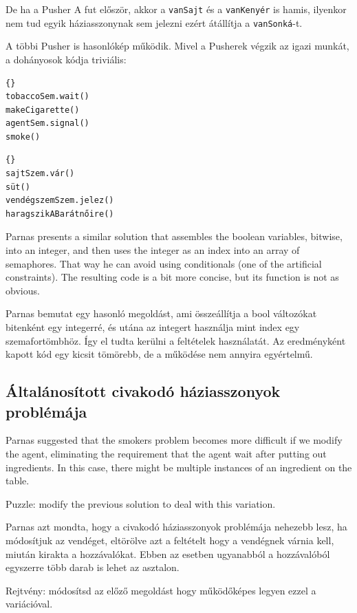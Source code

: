 \documentclass{book}
\begin{document}
De ha a Pusher A fut először, akkor a {\tt vanSajt} és a {\tt vanKenyér}
is hamis, ilyenkor nem tud egyik háziasszonynak sem jelezni ezért
átállítja a {\tt vanSonká}-t.

A többi Pusher is hasonlókép működik. Mivel a Pusherek végzik
az igazi munkát, a dohányosok kódja triviális:

\begin{lstlisting}[title={Smoker with tobacco}]{}
tobaccoSem.wait()
makeCigarette()
agentSem.signal()
smoke()
\end{lstlisting}

\begin{lstlisting}[title={Sajtos háziasszony}]{}
sajtSzem.vár()
süt()
vendégszemSzem.jelez()
haragszikABarátnőire()
\end{lstlisting}

Parnas presents a similar solution that assembles the
boolean variables, bitwise, into an integer, and then
uses the integer as an index into an array of semaphores.
That way he can avoid using conditionals (one of the
artificial constraints).  The resulting code is a bit
more concise, but its function is not as obvious.

Parnas bemutat egy hasonló megoldást, ami összeállítja a
bool változókat bitenként egy integerré, és utána az integert
használja mint index egy szemafortömbhöz. Így
el tudta kerülni a feltételek használatát. Az eredményként kapott
kód egy kicsit tömörebb, de a működése nem annyira egyértelmű.

\subsection{Általánosított civakodó háziasszonyok problémája}

Parnas suggested that the smokers problem becomes more
difficult if we modify the agent, eliminating the requirement
that the agent wait after putting out ingredients.  In this
case, there might be multiple instances of an ingredient on
the table.

Puzzle: modify the previous solution to deal with this
variation.

Parnas azt mondta, hogy a civakodó háziasszonyok problémája nehezebb lesz,
ha módosítjuk az vendéget, eltörölve azt a feltételt hogy
a vendégnek várnia kell, miután kirakta a hozzávalókat.
Ebben az esetben ugyanabból a hozzávalóból egyszerre több darab
is lehet az asztalon.

Rejtvény: módosítsd az előző megoldást hogy működőképes legyen
ezzel a variációval.
\end{document}
